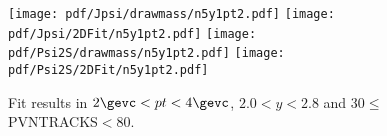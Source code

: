 \begin{figure}[H]
\begin{center}
\texttt{[image: pdf/Jpsi/drawmass/n5y1pt2.pdf]}
\texttt{[image: pdf/Jpsi/2DFit/n5y1pt2.pdf]}
\vspace*{-0.5cm}
\texttt{[image: pdf/Psi2S/drawmass/n5y1pt2.pdf]}
\texttt{[image: pdf/Psi2S/2DFit/n5y1pt2.pdf]}
\vspace*{-0.5cm}
\end{center}
\caption{Fit results in $2\gevc<pt<4\gevc$, $2.0<y<2.8$ and 30$\leq$PVNTRACKS$<$80.}
\label{Fitn5y1pt2}
\end{figure}
